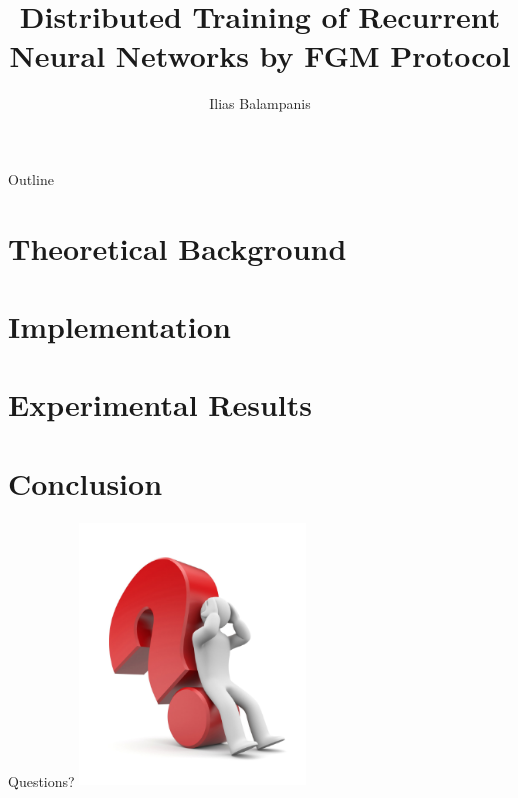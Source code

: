 \documentclass{beamer}
\title[Diploma Thesis Presentation]{Distributed Training of Recurrent Neural Networks by FGM Protocol}
\author{Ilias Balampanis}
\institute[TUC]{ %
School of Electrical and Computer Engineering \\
Technical University of Crete}
\begin{document}
    \begin{frame}
        \titlepage
    \end{frame}

    \begin{frame}{Outline}
        \tableofcontents
    \end{frame}



    \section{Theoretical Background}\label{sec:theoretical-background}
    



    \section{Implementation}\label{sec:implementation}
    



    \section{Experimental Results}\label{sec:experimental-results}
    



    \section{Conclusion}\label{sec:conclusion}
    


    \begin{frame}{Questions?}
        \centering
        \includegraphics[width=6cm,height=7cm]{images/question-mark.png}
    \end{frame}
\end{document}
